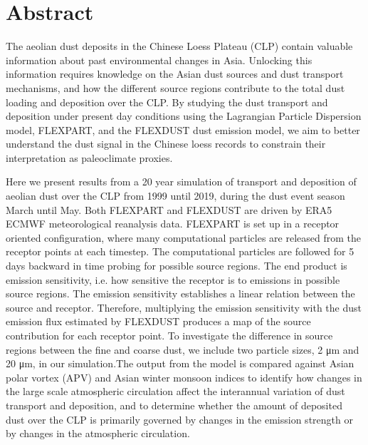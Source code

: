 \chapter*{Abstract}
The aeolian dust deposits in the Chinese Loess Plateau (CLP) contain valuable information about past environmental changes in Asia. Unlocking this information requires knowledge on the Asian dust sources and dust transport mechanisms, and how the different source regions contribute to the total dust loading and deposition over the CLP.  By studying the dust transport and deposition under present day conditions using the Lagrangian Particle Dispersion model,  FLEXPART,  and the FLEXDUST dust emission model, we aim to better understand the dust signal in the Chinese loess records to constrain their interpretation as paleoclimate proxies.  

Here we present results from a 20 year simulation of transport and deposition of aeolian dust over the CLP from 1999 until 2019, during the dust event season March until May. Both FLEXPART and FLEXDUST are driven by ERA5 ECMWF meteorological reanalysis data. FLEXPART is set up in a receptor oriented configuration, where many computational particles are released from the receptor points at each timestep. The computational particles are followed for 5 days backward in time probing for possible source regions. The end product is emission sensitivity, i.e. how sensitive the receptor is to emissions in possible source regions. The emission sensitivity establishes a linear relation between the source and receptor. Therefore, multiplying the emission sensitivity with the dust emission flux estimated by FLEXDUST produces a map of the source contribution for each receptor point. To investigate the difference in source regions between the fine and coarse dust, we include two particle sizes, 2 μm and 20 μm, in our simulation.The output from the model is compared against Asian polar vortex (APV) and Asian winter monsoon indices to identify how changes in the large scale atmospheric circulation affect the interannual variation of dust transport and deposition, and to determine whether the amount of deposited dust over the CLP is primarily governed by changes in the emission strength or by changes in the atmospheric circulation.  
